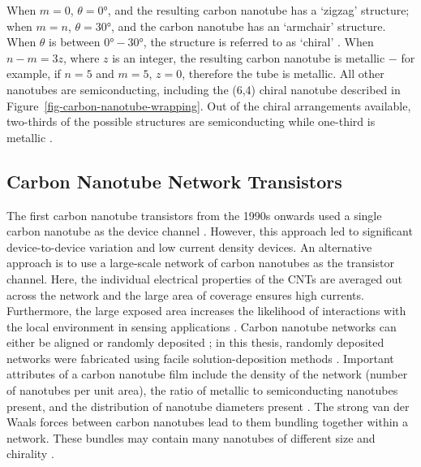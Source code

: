 \documentclass[
  a4paper,
]{scrbook}
\begin{document}
When \(m=0\), \(\theta = 0°\), and the resulting carbon nanotube has a
`zigzag' structure; when \(m=n\), \(\theta = 30°\), and the carbon
nanotube has an `armchair' structure. When \(\theta\) is between
\(0°-30°\), the structure is referred to as `chiral'
\autocite{Dekker1999,Lu2012}. When \(n-m=3z\), where \(z\) is an
integer, the resulting carbon nanotube is metallic \(-\) for example, if
\(n=5\) and \(m=5\), \(z=0\), therefore the tube is metallic. All other
nanotubes are semiconducting, including the (6,4) chiral nanotube
described in Figure~\ref{fig-carbon-nanotube-wrapping}. Out of the
chiral arrangements available, two-thirds of the possible structures are
semiconducting while one-third is metallic \autocite{Dekker1999}.

\hypertarget{sec-cnt-network-details}{%
\subsection{Carbon Nanotube Network
Transistors}\label{sec-cnt-network-details}}

The first carbon nanotube transistors from the 1990s onwards used a
single carbon nanotube as the device channel
\autocite{Martel1998,Tans1998}. However, this approach led to
significant device-to-device variation and low current density devices.
An alternative approach is to use a large-scale network of carbon
nanotubes as the transistor channel. Here, the individual electrical
properties of the CNTs are averaged out across the network and the large
area of coverage ensures high currents. Furthermore, the large exposed
area increases the likelihood of interactions with the local environment
in sensing applications
\autocite{Hu2004,Cao2009,Murugathas2019a,Li2023}. Carbon nanotube
networks can either be aligned or randomly deposited
\autocite{Cao2009,Shkodra2021}; in this thesis, randomly deposited
networks were fabricated using facile solution-deposition methods
\autocite{Zheng2017,Cassie2023}. Important attributes of a carbon
nanotube film include the density of the network (number of nanotubes
per unit area), the ratio of metallic to semiconducting nanotubes
present, and the distribution of nanotube diameters present
\autocite{Cao2009,Shkodra2021}. The strong van der Waals forces between
carbon nanotubes lead to them bundling together within a network. These
bundles may contain many nanotubes of different size and chirality
\autocite{Fuhrer2000,Hu2004,Cao2009,Murugathas2019a}.
\end{document}

